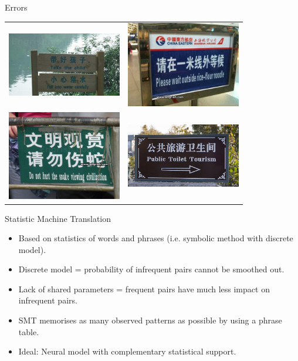\documentclass{beamer}
\begin{document}
\begin{frame}{Errors}
\centering
\begin{tabular}{cc}
\includegraphics[width=5cm]{error1} & \includegraphics[width=5cm]{error2}\\
\includegraphics[width=5cm]{error3} & \includegraphics[width=5cm]{error4}
\end{tabular}
\end{frame}

\begin{frame}{Statistic Machine Translation}
\begin{itemize}
\item Based on statistics of words and phrases (i.e. symbolic method with discrete model).
\item Discrete model = probability of infrequent pairs cannot be smoothed out.
\item Lack of shared parameters = frequent pairs have much less impact on infrequent pairs.
\item SMT memorises as many observed patterns as possible by using a phrase table.
\item Ideal: Neural model with complementary statistical support.
\end{itemize}
\end{frame}
\end{document}
